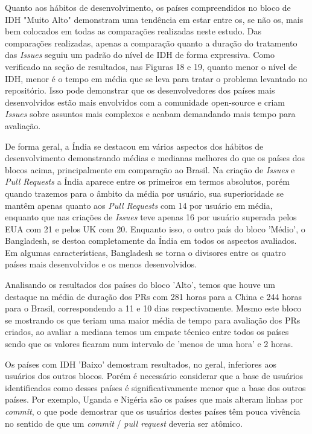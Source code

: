 \documentclass[12pt]{article}
\begin{document}
Quanto aos hábitos de desenvolvimento, os países compreendidos no bloco de IDH "Muito Alto" demonstram uma tendência em estar entre os, se não os, mais bem colocados em todas as comparações realizadas neste estudo. Das comparações realizadas, apenas a comparação quanto a duração do tratamento das \textit{Issues} seguiu um padrão do nível de IDH de forma expressiva. Como verificado na seção de resultados, nas Figuras 18 e 19, quanto menor o nível de IDH, menor é o tempo em média que se leva para tratar o problema levantado no repositório. Isso pode demonstrar que os desenvolvedores dos países mais desenvolvidos estão mais envolvidos com a comunidade open-source e criam \textit{Issues} sobre assuntos mais complexos e acabam demandando mais tempo para avaliação.

De forma geral, a Índia se destacou em vários aspectos dos hábitos de desenvolvimento demonstrando médias e medianas melhores do que os países dos blocos acima, principalmente em comparação ao Brasil. Na criação de \textit{Issues} e \textit{Pull Requests} a Índia aparece entre os primeiros em termos absolutos, porém quando trazemos para o âmbito da média por usuário, sua superioridade se mantêm apenas quanto aos \textit{Pull Requests} com 14 por usuário em média, enquanto que nas criações de \textit{Issues} teve apenas 16 por usuário superada pelos EUA com 21 e pelos UK com 20. Enquanto isso, o outro país do bloco 'Médio', o Bangladesh, se destoa completamente da Índia em todos os aspectos avaliados. Em algumas características, Bangladesh se torna o divisores entre os quatro países mais desenvolvidos e os menos desenvolvidos.

Analisando os resultados dos países do bloco 'Alto', temos que houve um destaque na média de duração dos PRs com 281 horas para a China e 244 horas para o Brasil, correspondendo a 11 e 10 dias respectivamente. Mesmo este bloco se mostrando os que teriam uma maior média de tempo para avaliação dos PRs criados, ao avaliar a mediana temos um empate técnico entre todos os países sendo que os valores ficaram num intervalo de 'menos de uma hora' e 2 horas.  

Os países com IDH 'Baixo' demostram resultados, no geral, inferiores aos usuários dos outros blocos. Porém é necessário considerar que a base de usuários identificados como desses países é significativamente menor que a base dos outros países. Por exemplo, Uganda e Nigéria são os países que mais alteram linhas por \textit{commit}, o que pode demostrar que os usuários destes países têm pouca vivência no sentido de que um \textit{commit} / \textit{pull request} deveria ser atômico.
\end{document}
